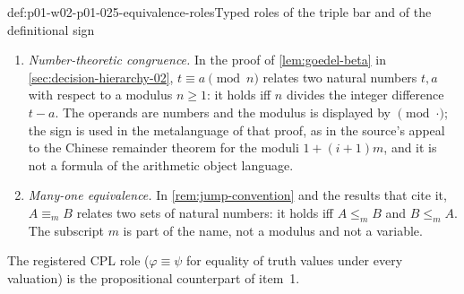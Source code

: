 \begin{hbconvention}{def:p01-w02-p01-025-equivalence-roles}{Typed roles of the triple bar and of the definitional sign}
\begin{enumerate}
  \cref{sec:latex-style-01} and the notation table of \cref{app:notation}
  list \(\varphi\equiv\psi\) as a metalinguistic relation that is available
  only after a semantic class has been declared: it then states that the two
  formulas are logically equivalent with respect to that class.  This entry
  is a schema, not a further relation.  For the class of all valuations it
  is the registered CPL role; for the class of all first-order structures
  with their assignments it is item~1.
  \item \emph{Number-theoretic congruence.}  In the proof of
  \cref{lem:goedel-beta} in \cref{sec:decision-hierarchy-02},
  \(t\equiv a\pmod n\) relates two natural numbers \(t,a\) with respect to a
  modulus \(n\geq1\): it holds iff \(n\) divides the integer difference
  \(t-a\).  The operands are numbers and the modulus is displayed by
  \(\pmod{\cdot}\); the sign is used in the metalanguage of that proof, as
  in the source's appeal to the Chinese remainder theorem for the moduli
  \(1+(i+1)m\), and it is not a formula of the arithmetic object language.
  \item \emph{Many-one equivalence.}  In \cref{rem:jump-convention} and the
  results that cite it, \(A\equiv_m B\) relates two sets of natural numbers:
  it holds iff \(A\leq_m B\) and \(B\leq_m A\).  The subscript \(m\) is part
  of the name, not a modulus and not a variable.
\end{enumerate}
The registered CPL role (\(\varphi\equiv\psi\) for equality of truth values
under every valuation) is the propositional counterpart of item~1.
\end{hbconvention}

